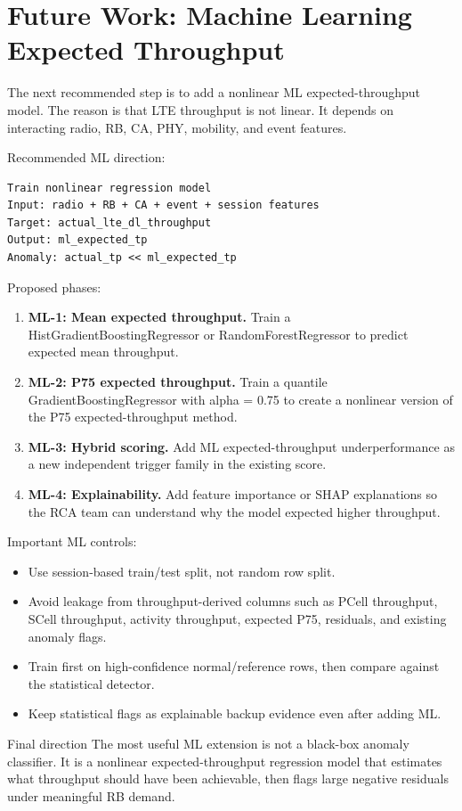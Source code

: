 \documentclass[12pt,a4paper]{article}
\begin{document}
\section{Future Work: Machine Learning Expected Throughput}

The next recommended step is to add a nonlinear ML expected-throughput model. The reason is that LTE throughput is not linear. It depends on interacting radio, RB, CA, PHY, mobility, and event features.

Recommended ML direction:
\begin{lstlisting}
Train nonlinear regression model
Input: radio + RB + CA + event + session features
Target: actual_lte_dl_throughput
Output: ml_expected_tp
Anomaly: actual_tp << ml_expected_tp
\end{lstlisting}

Proposed phases:
\begin{enumerate}
    \item \textbf{ML-1: Mean expected throughput.} Train a HistGradientBoostingRegressor or RandomForestRegressor to predict expected mean throughput.
    \item \textbf{ML-2: P75 expected throughput.} Train a quantile GradientBoostingRegressor with alpha = 0.75 to create a nonlinear version of the P75 expected-throughput method.
    \item \textbf{ML-3: Hybrid scoring.} Add ML expected-throughput underperformance as a new independent trigger family in the existing score.
    \item \textbf{ML-4: Explainability.} Add feature importance or SHAP explanations so the RCA team can understand why the model expected higher throughput.
\end{enumerate}

Important ML controls:
\begin{itemize}
    \item Use session-based train/test split, not random row split.
    \item Avoid leakage from throughput-derived columns such as PCell throughput, SCell throughput, activity throughput, expected P75, residuals, and existing anomaly flags.
    \item Train first on high-confidence normal/reference rows, then compare against the statistical detector.
    \item Keep statistical flags as explainable backup evidence even after adding ML.
\end{itemize}

\begin{infobox}{Final direction}
The most useful ML extension is not a black-box anomaly classifier. It is a nonlinear expected-throughput regression model that estimates what throughput should have been achievable, then flags large negative residuals under meaningful RB demand.
\end{infobox}
\end{document}

